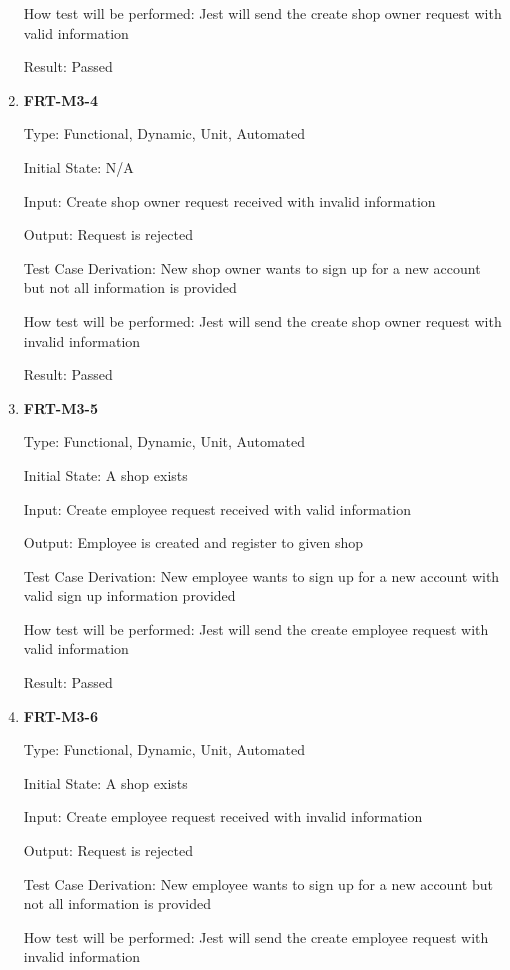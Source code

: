 \documentclass[12pt, titlepage]{article}
\begin{document}
\begin{enumerate}
	      How test will be performed: Jest will send the create shop owner request with valid information

	      Result: Passed

	\item \textbf{FRT-M3-4}

	      Type: Functional, Dynamic, Unit, Automated

	      Initial State: N/A

	      Input: Create shop owner request received with invalid information

	      Output: Request is rejected

	      Test Case Derivation: New shop owner wants to sign up for a new account but not all information is
	      provided

	      How test will be performed: Jest will send the create shop owner request with invalid information

	      Result: Passed

	\item \textbf{FRT-M3-5}

	      Type: Functional, Dynamic, Unit, Automated

	      Initial State: A shop exists

	      Input: Create employee request received with valid information

	      Output: Employee is created and register to given shop

	      Test Case Derivation: New employee wants to sign up for a new account with valid sign up
	      information provided

	      How test will be performed: Jest will send the create employee request with valid information

	      Result: Passed

	\item \textbf{FRT-M3-6}

	      Type: Functional, Dynamic, Unit, Automated

	      Initial State: A shop exists

	      Input: Create employee request received with invalid information

	      Output: Request is rejected

	      Test Case Derivation: New employee wants to sign up for a new account but not all information is
	      provided

	      How test will be performed: Jest will send the create employee request with invalid information


\end{enumerate}
\end{document}
